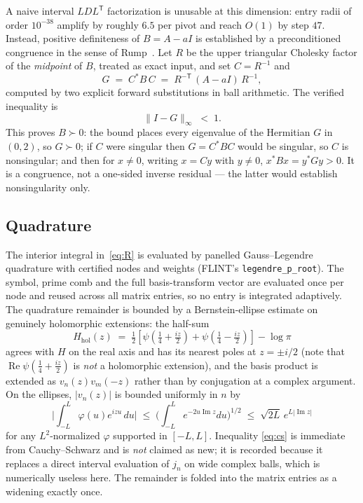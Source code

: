 \documentclass[11pt,a4paper]{article}
\theoremstyle{definition}
\theoremstyle{remark}
\newcommand{\src}[1]{{\footnotesize\texttt{#1}}}
\begin{document}
A naive interval $LDL^{\mathsf T}$ factorization is unusable at this dimension:
entry radii of order $10^{-38}$ amplify by roughly $6.5$ per pivot and reach
$O(1)$ by step $47$. Instead, positive definiteness of $B = A - aI$ is
established by a preconditioned congruence in the sense of Rump~\cite{Rump}. Let $R$ be the
upper triangular Cholesky factor of the \emph{midpoint} of $B$, treated as exact
input, and set $C = R^{-1}$ and
\[
   G \;=\; C^{*} B\, C \;=\; R^{-\mathsf T}\,(A - aI)\, R^{-1},
\]
computed by two explicit forward substitutions in ball arithmetic. The verified
inequality is
\[
   \| I - G \|_{\infty} \;<\; 1 .
\]
This proves $B \succ 0$: the bound places every eigenvalue of the Hermitian $G$
in $(0,2)$, so $G \succ 0$; if $C$ were singular then $G = C^{*}BC$ would be
singular, so $C$ is nonsingular; and then for $x \ne 0$, writing $x = Cy$ with
$y \ne 0$, $x^{*}Bx = y^{*}Gy > 0$. It is a congruence, not a one-sided inverse
residual --- the latter would establish nonsingularity only.

\subsection{Quadrature}

The interior integral in~\eqref{eq:R} is evaluated by panelled
Gauss--Legendre quadrature with certified nodes and weights (FLINT's
\src{legendre\_p\_root}). The symbol, prime comb and the full basis-transform
vector are evaluated once per node and reused across all matrix entries, so no
entry is integrated adaptively. The quadrature remainder is bounded by a
Bernstein-ellipse estimate on genuinely holomorphic extensions: the half-sum
\[
   H_{\mathrm{hol}}(z) \;=\; \tfrac12\left[
     \psi\!\left(\tfrac14 + \tfrac{iz}{2}\right)
   + \psi\!\left(\tfrac14 - \tfrac{iz}{2}\right)\right] - \log\pi
\]
agrees with $H$ on the real axis and has its nearest poles at $z = \pm i/2$
(note that $\operatorname{Re}\psi(\frac14 + \frac{iz}{2})$ is \emph{not} a
holomorphic extension), and the basis product is extended as $v_n(z)v_m(-z)$
rather than by conjugation at a complex argument. On the ellipses, $|v_n(z)|$ is
bounded uniformly in $n$ by
\begin{equation}
\label{eq:cs}
   \Big|\int_{-L}^{L}\varphi(u) e^{izu}\,du\Big|
   \;\le\; \Big(\int_{-L}^{L} e^{-2u \operatorname{Im} z}du\Big)^{1/2}
   \;\le\; \sqrt{2L}\, e^{L|\operatorname{Im} z|}
\end{equation}
for any $L^2$-normalized $\varphi$ supported in $[-L,L]$. Inequality
\eqref{eq:cs} is immediate from Cauchy--Schwarz and is \emph{not} claimed as
new; it is recorded because it replaces a direct interval evaluation of
$j_n$ on wide complex balls, which is numerically useless here. The remainder is
folded into the matrix entries as a widening exactly once.
\end{document}
